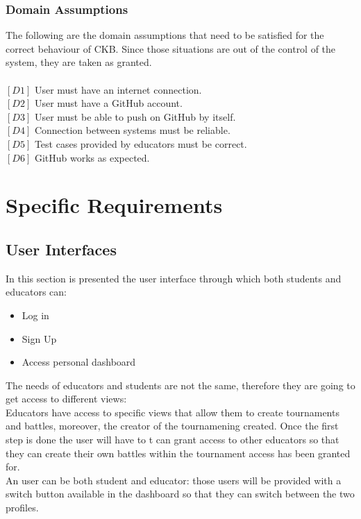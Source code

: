 \documentclass{article}
\begin{document}
\subsubsection{Domain Assumptions}
The following are the domain assumptions that need to be satisfied for the correct behaviour of CKB. Since those situations are out of the control of the system, they are taken as granted.\\\\
$[D1]$ User must have an internet connection.\\
$[D2]$ User must have a GitHub account.\\
$[D3]$ User must be able to push on GitHub by itself.\\
$[D4]$ Connection between systems must be reliable.\\
$[D5]$ Test cases provided by educators must be correct.\\
$[D6]$ GitHub works as expected.\\
\newpage
\section{Specific Requirements}
\subsection{User Interfaces}
In this section is presented the user interface through which both students and educators can:
\begin{itemize}
    \item Log in
    \item Sign Up
    \item Access personal dashboard
\end{itemize}
The needs of educators and students are not the same, therefore they are going to get access to different views:\\
Educators have access to specific views that allow them to create tournaments and battles, moreover, the creator of the tournamening created.
Once the first step is done the user will have to t can grant access to other educators so that they can create their own battles within the tournament access has been granted for.\\
An user can be both student and educator: those users will be provided with a switch button available in the dashboard so that they can switch between the two profiles.\\
\end{document}
